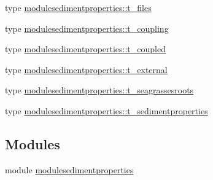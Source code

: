 \begin{DoxyCompactItemize}
\item 
type \mbox{\hyperlink{structmodulesedimentproperties_1_1t__files}{modulesedimentproperties\+::t\+\_\+files}}
\item 
type \mbox{\hyperlink{structmodulesedimentproperties_1_1t__coupling}{modulesedimentproperties\+::t\+\_\+coupling}}
\item 
type \mbox{\hyperlink{structmodulesedimentproperties_1_1t__coupled}{modulesedimentproperties\+::t\+\_\+coupled}}
\item 
type \mbox{\hyperlink{structmodulesedimentproperties_1_1t__external}{modulesedimentproperties\+::t\+\_\+external}}
\item 
type \mbox{\hyperlink{structmodulesedimentproperties_1_1t__seagrassesroots}{modulesedimentproperties\+::t\+\_\+seagrassesroots}}
\item 
type \mbox{\hyperlink{structmodulesedimentproperties_1_1t__sedimentproperties}{modulesedimentproperties\+::t\+\_\+sedimentproperties}}
\end{DoxyCompactItemize}
\subsection*{Modules}
\begin{DoxyCompactItemize}
\item 
module \mbox{\hyperlink{namespacemodulesedimentproperties}{modulesedimentproperties}}
\end{DoxyCompactItemize}
